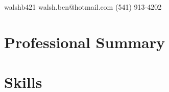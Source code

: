 \documentclass[12pt,letterpaper]{article}
\begin{document}
	

	\vspace{0.5cm}

	\noindent
    \faGithub
	\hspace{0.15cm}
	walshb421
	\hfill
	\faEnvelope
	\hspace{0.15cm}
	walsh.ben@hotmail.com	
	\hfill
	\faPhone
	\hspace{0.15cm}
	(541) 913-4202
	
	
	\section*{Professional Summary}
	
	\section*{Skills}
\end{document}
